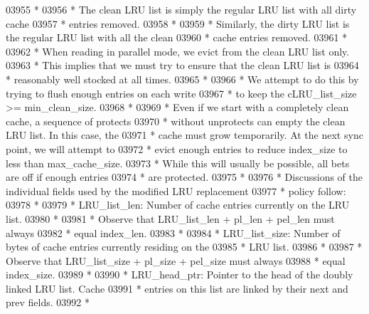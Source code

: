 \begin{DoxyCode}
03955 \textcolor{comment}{ *}
03956 \textcolor{comment}{ * The clean LRU list is simply the regular LRU list with all dirty cache}
03957 \textcolor{comment}{ * entries removed.}
03958 \textcolor{comment}{ *}
03959 \textcolor{comment}{ * Similarly, the dirty LRU list is the regular LRU list with all the clean}
03960 \textcolor{comment}{ * cache entries removed.}
03961 \textcolor{comment}{ *}
03962 \textcolor{comment}{ * When reading in parallel mode, we evict from the clean LRU list only.}
03963 \textcolor{comment}{ * This implies that we must try to ensure that the clean LRU list is}
03964 \textcolor{comment}{ * reasonably well stocked at all times.}
03965 \textcolor{comment}{ *}
03966 \textcolor{comment}{ * We attempt to do this by trying to flush enough entries on each write}
03967 \textcolor{comment}{ * to keep the cLRU\_list\_size >= min\_clean\_size.}
03968 \textcolor{comment}{ *}
03969 \textcolor{comment}{ * Even if we start with a completely clean cache, a sequence of protects}
03970 \textcolor{comment}{ * without unprotects can empty the clean LRU list.  In this case, the}
03971 \textcolor{comment}{ * cache must grow temporarily.  At the next sync point, we will attempt to}
03972 \textcolor{comment}{ * evict enough entries to reduce index\_size to less than max\_cache\_size.}
03973 \textcolor{comment}{ * While this will usually be possible, all bets are off if enough entries}
03974 \textcolor{comment}{ * are protected.}
03975 \textcolor{comment}{ *}
03976 \textcolor{comment}{ * Discussions of the individual fields used by the modified LRU replacement}
03977 \textcolor{comment}{ * policy follow:}
03978 \textcolor{comment}{ *}
03979 \textcolor{comment}{ * LRU\_list\_len:  Number of cache entries currently on the LRU list.}
03980 \textcolor{comment}{ *}
03981 \textcolor{comment}{ *              Observe that LRU\_list\_len + pl\_len + pel\_len must always }
03982 \textcolor{comment}{ *      equal index\_len.}
03983 \textcolor{comment}{ *}
03984 \textcolor{comment}{ * LRU\_list\_size:  Number of bytes of cache entries currently residing on the}
03985 \textcolor{comment}{ *              LRU list.}
03986 \textcolor{comment}{ *}
03987 \textcolor{comment}{ *              Observe that LRU\_list\_size + pl\_size + pel\_size must always }
03988 \textcolor{comment}{ *      equal index\_size.}
03989 \textcolor{comment}{ *}
03990 \textcolor{comment}{ * LRU\_head\_ptr:  Pointer to the head of the doubly linked LRU list.  Cache}
03991 \textcolor{comment}{ *              entries on this list are linked by their next and prev fields.}
03992 \textcolor{comment}{ *}

\end{DoxyCode}
